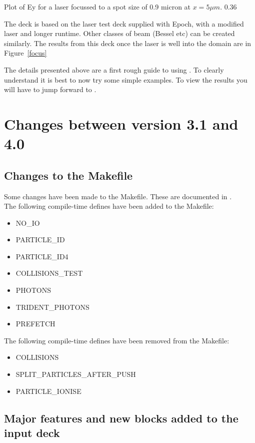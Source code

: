   {Plot of Ey for a laser focussed to a spot size of 0.9 micron at $x=5\mu m$.}
  {0.36}

The deck is based on the laser test deck supplied with Epoch, with a modified
laser and longer runtime. Other classes of beam (Bessel etc) can be created
similarly. The results from this deck once the laser is well into the domain
are in Figure~\ref{focus}

The details presented above are a first rough guide to using {\EPOCH}. To
clearly understand {\EPOCH} it is best to now try some simple examples. To
view the results you will have to jump forward to .



\appendix
\section{Changes between version 3.1 and 4.0}

\subsection{Changes to the Makefile}

Some changes have been made to the Makefile. These are documented in
.\\

\noindent The following compile-time defines have been added to the Makefile:
\begin{itemize}
\item NO\_IO
\item PARTICLE\_ID
\item PARTICLE\_ID4
\item COLLISIONS\_TEST
\item PHOTONS
\item TRIDENT\_PHOTONS
\item PREFETCH
\end{itemize}
\bigskip

\noindent The following compile-time defines have been removed from the
   Makefile:
\begin{itemize}
\item COLLISIONS
\item SPLIT\_PARTICLES\_AFTER\_PUSH
\item PARTICLE\_IONISE
\end{itemize}

\subsection{Major features and new blocks added to the input deck}

